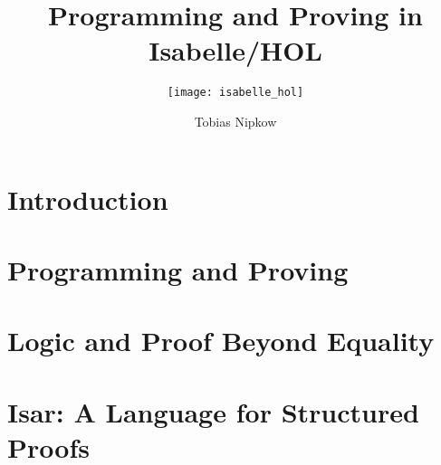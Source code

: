 \documentclass[envcountsame,envcountchap]{svmono}
\begin{document}
\title{Programming and Proving in Isabelle/HOL}
\subtitle{\texttt{[image: isabelle\_hol]}}
\author{Tobias Nipkow}
\maketitle

\frontmatter%

\setcounter{tocdepth}{1}
\tableofcontents


\mainmatter%


\chapter{Introduction}


\chapter{Programming and Proving}
\label{sec:FP}




%

\chapter{Logic and Proof Beyond Equality}
\label{ch:Logic}


\chapter{Isar: A Language for Structured Proofs}
\label{ch:Isar}


\backmatter%




\end{document}
